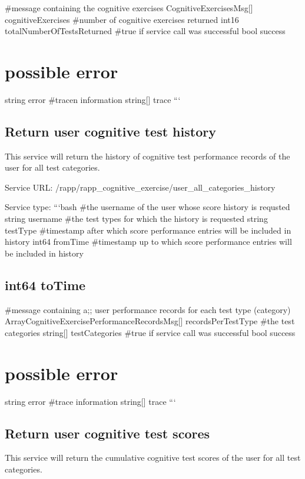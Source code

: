 \#message containing the cognitive exercises Cognitive\-Exercises\-Msg\mbox{[}\mbox{]} cognitive\-Exercises \#number of cognitive exercises returned int16 total\-Number\-Of\-Tests\-Returned \#true if service call was successful bool success \section*{possible error}

string error \#tracen information string\mbox{[}\mbox{]} trace ```

\subsection*{Return user cognitive test history}

This service will return the history of cognitive test performance records of the user for all test categories.

Service U\-R\-L\-: {\ttfamily /rapp/rapp\-\_\-cognitive\-\_\-exercise/user\-\_\-all\-\_\-categories\-\_\-history}

Service type\-: ```bash \#the username of the user whose score history is requsted string username \#the test types for which the history is requested string test\-Type \#timestamp after which score performance entries will be included in history int64 from\-Time \#timestamp up to which score performance entries will be included in history \subsection*{int64 to\-Time }

\#message containing a;; user performance records for each test type (category) Array\-Cognitive\-Exercise\-Performance\-Records\-Msg\mbox{[}\mbox{]} records\-Per\-Test\-Type \#the test categories string\mbox{[}\mbox{]} test\-Categories \#true if service call was successful bool success \section*{possible error}

string error \#trace information string\mbox{[}\mbox{]} trace ```

\subsection*{Return user cognitive test scores}

This service will return the cumulative cognitive test scores of the user for all test categories.

